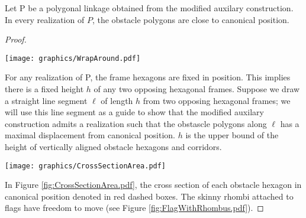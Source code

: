 \begin{lem}\label{lem:aux-C}
Let P be a polygonal linkage obtained from the modified auxilary construction.  
In every realization of $P$, the obstacle polygons are close to canonical position.
\end{lem}

\begin{proof}

\begin{minipage}{\linewidth}
\begin{center}
\texttt{[image: graphics/WrapAround.pdf]}
\label{fig:WrapAround.pdf}
\end{center}
\end{minipage}


For any realization of P, the frame hexagons are fixed in position.  
This implies there is a fixed height $h$ of any two opposing hexagonal frames.
Suppose we draw a straight line segment $\ell$ of length $h$ from two opposing hexagonal frames; we will use this line segment as a guide to show that the modified auxilary construction admits a realization such that the obstascle polygons along $\ell$ has a maximal displacement from canonical position.
$h$ is the upper bound of the height of vertically aligned obstacle hexagons and corridors.

\begin{minipage}{\linewidth}
\begin{center}
\texttt{[image: graphics/CrossSectionArea.pdf]}
\label{fig:CrossSectionArea.pdf}
\end{center}
\end{minipage}

In Figure \ref{fig:CrossSectionArea.pdf}, the cross section of each obstacle hexagon in canonical position denoted in red dashed boxes.
The skinny rhombi attached to flags have freedom to move (see Figure \ref{fig:FlagWithRhombus.pdf}).


\end{proof}
